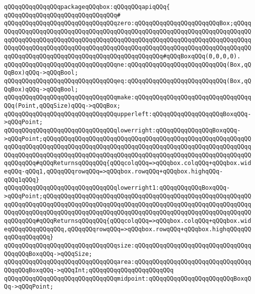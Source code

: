 \verb|qQQqqQQqqQQqqQQqpackageqQQqbox:qQQqqQQqapiqQQq{|\newline
\verb|qQQqqQQqqQQqqQQqqQQqqQQqqQQqqQQq#|\newline
\verb|qQQqqQQqqQQqqQQqqQQqqQQqqQQqqQQqzero:qQQqqQQqqQQqqQQqqQQqqQQqBox;qQQqqQQqqQQqqQQqqQQqqQQqqQQqqQQqqQQqqQQqqQQqqQQqqQQqqQQqqQQqqQQqqQQqqQQqqQQqqQQqqQQqqQQqqQQqqQQqqQQqqQQqqQQqqQQqqQQqqQQqqQQqqQQqqQQqqQQqqQQqqQQqqQQqqQQqqQQqqQQqqQQqqQQqqQQqqQQqqQQqqQQqqQQqqQQqqQQqqQQqqQQqqQQqqQQqqQQqqQQqqQQqqQQqqQQqqQQqqQQqqQQqqQQqqQQqqQQqqQQq#qQQqBoxqQQq(0,0,0,0).|\newline
\newline
\verb|qQQqqQQqqQQqqQQqqQQqqQQqqQQqqQQqne:qQQqqQQqqQQqqQQqqQQqqQQqqQQq(Box,qQQqBox)qQQq->qQQqBool;|\newline
\verb|qQQqqQQqqQQqqQQqqQQqqQQqqQQqqQQqeq:qQQqqQQqqQQqqQQqqQQqqQQqqQQq(Box,qQQqBox)qQQq->qQQqBool;|\newline
\newline
\verb|qQQqqQQqqQQqqQQqqQQqqQQqqQQqqQQqmake:qQQqqQQqqQQqqQQqqQQqqQQqqQQqqQQqqQQq(Point,qQQqSize)qQQq->qQQqBox;|\newline
\verb|qQQqqQQqqQQqqQQqqQQqqQQqqQQqqQQqupperleft:qQQqqQQqqQQqqQQqqQQqBoxqQQq->qQQqPoint;|\newline
\verb|qQQqqQQqqQQqqQQqqQQqqQQqqQQqqQQqlowerright:qQQqqQQqqQQqqQQqBoxqQQq->qQQqPoint;qQQqqQQqqQQqqQQqqQQqqQQqqQQqqQQqqQQqqQQqqQQqqQQqqQQqqQQqqQQqqQQqqQQqqQQqqQQqqQQqqQQqqQQqqQQqqQQqqQQqqQQqqQQqqQQqqQQqqQQqqQQqqQQqqQQqqQQqqQQqqQQqqQQqqQQqqQQqqQQqqQQqqQQqqQQqqQQqqQQqqQQqqQQqqQQqqQQqqQQqqQQqqQQq#qQQqReturnsqQQqqQQq{qQQqcolqQQq=>qQQqbox.colqQQq+qQQqbox.wideqQQq-qQQq1,qQQqqQQqrowqQQq=>qQQqbox.rowqQQq+qQQqbox.highqQQq-qQQq1qQQq}|\newline
\verb|qQQqqQQqqQQqqQQqqQQqqQQqqQQqqQQqlowerright1:qQQqqQQqqQQqBoxqQQq->qQQqPoint;qQQqqQQqqQQqqQQqqQQqqQQqqQQqqQQqqQQqqQQqqQQqqQQqqQQqqQQqqQQqqQQqqQQqqQQqqQQqqQQqqQQqqQQqqQQqqQQqqQQqqQQqqQQqqQQqqQQqqQQqqQQqqQQqqQQqqQQqqQQqqQQqqQQqqQQqqQQqqQQqqQQqqQQqqQQqqQQqqQQqqQQqqQQqqQQqqQQqqQQqqQQqqQQq#qQQqReturnsqQQqqQQq{qQQqcolqQQq=>qQQqbox.colqQQq+qQQqbox.wideqQQqqQQqqQQqqQQq,qQQqqQQqrowqQQq=>qQQqbox.rowqQQq+qQQqbox.highqQQqqQQqqQQqqQQqqQQq}|\newline
\verb|qQQqqQQqqQQqqQQqqQQqqQQqqQQqqQQqsize:qQQqqQQqqQQqqQQqqQQqqQQqqQQqqQQqqQQqqQQqBoxqQQq->qQQqSize;|\newline
\verb|qQQqqQQqqQQqqQQqqQQqqQQqqQQqqQQqarea:qQQqqQQqqQQqqQQqqQQqqQQqqQQqqQQqqQQqqQQqBoxqQQq->qQQqInt;qQQqqQQqqQQqqQQqqQQqqQQq|\newline
\verb|qQQqqQQqqQQqqQQqqQQqqQQqqQQqqQQqmidpoint:qQQqqQQqqQQqqQQqqQQqqQQqBoxqQQq->qQQqPoint;|\newline
